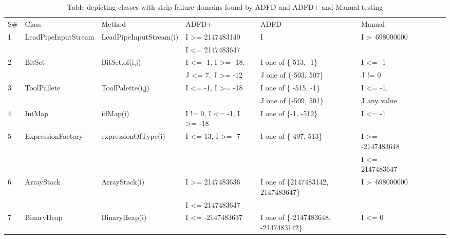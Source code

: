 \documentclass[runningheads,a4paper]{llncs}
\begin{document}
\begin{table}[h]
\caption{Table depicting classes with strip failure-domains found by ADFD and ADFD+ and Manual testing}
\centering
{\renewcommand{\arraystretch}{0.9}
\begin{tabular}{llllllllll}

S\#  & Class						& Method 					& ADFD+       								& ADFD     								& Manual							\\
1	&LeadPipeInputStream 		& LeadPipeInputStream(i)		& I \textgreater= 2147483140				& I 										& I \textgreater~698000000			\\ 
	&                                             &                                             & I \textless= 2147483647  					&										&									\\
2	& BitSet				  		& BitSet.of(i,j)				& I \textless= -1, I \textgreater= -18,			& I one of \{-513, -1\}					& I \textless= -1						\\ 
	&                                             &                                             & J \textless= 7, J \textgreater= -12  			& J one of \{-503, 507\}					& J != 0								\\
3	& ToolPallete			  		& ToolPalette(i,j)				& I \textless= -1, I \textgreater= -18			& I one of \{ -515, -1\}					& I \textless= -1, 					\\ 
	&                                             &                                             & 				  							& J one of \{-509, 501\}					& J any value			   				\\
4	& IntMap			  		& idMap(i)					& I != 0, I \textless= -1, I \textgreater= -18	& I one of \{-1, -512\} 					& I \textless= -1						\\ 
5	& ExpressionFactory	  		& expressionOfType(i)		& I \textless= 13, I \textgreater= -7			& I one of \{-497, 513\}					& I \textgreater= -2147483648 		\\ 
	&                                             & 				  			& 											&										& I \textless= 2147483647			\\
6	& ArrayStack					& ArrayStack(i)				& I \textgreater= 2147483636				& I one of \{2147483142, 2147483647\}	& I \textgreater~698000000 			\\ 
	&                                             &                                             & I \textless= 2147483647 					& 										&  			   						\\
7	& BinaryHeap				& BinaryHeap(i)				& I \textless= -2147483637					& I one of \{-2147483648, -2147483142\}	& I \textless= 0						 \\

\end{tabular}}
\end{table}
\end{document}
